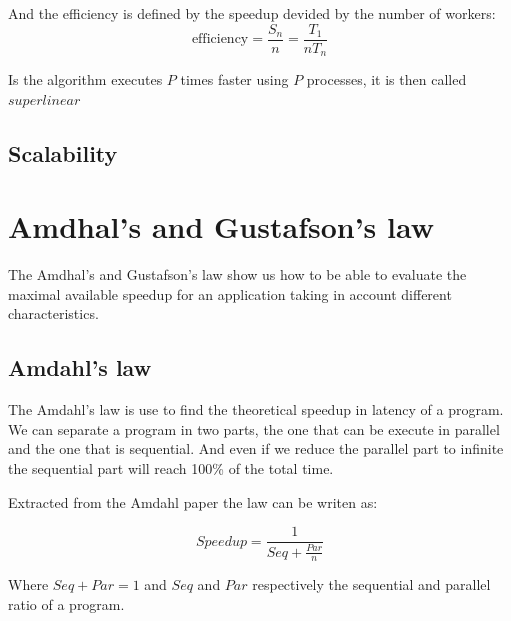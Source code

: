 
And the efficiency is defined by the speedup devided by the number of workers: 
\begin{equation}
\text{efficiency} = \frac{S_n}{n} = \frac{T_1}{nT_n}
\end{equation}

Is the algorithm executes $P$ times faster using $P$ processes, it is then called $superlinear$

\subsection{Scalability}

\section{Amdhal's and Gustafson's law}

The Amdhal's and Gustafson's law show us how to be able to evaluate the maximal available speedup for an application taking in account different characteristics. 

\subsection{Amdahl's law}

The Amdahl's law\cite{amdahl1967validity} is use to find the theoretical speedup in latency of a program.
We can separate a program in two parts, the one that can be execute in parallel and the one that is sequential. 
And even if we reduce the parallel part to infinite the sequential part will reach 100\% of the total time. 

Extracted from the Amdahl paper the law can be writen as: 

\begin{equation}
Speedup = \frac{1}{Seq + \frac{Par}{n}}
\end{equation}

Where $Seq + Par = 1$ and $Seq$ and $Par$ respectively the sequential and parallel ratio of a program. 


